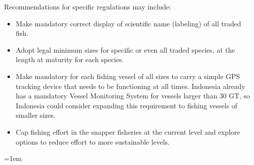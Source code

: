 \noindent Recommendations for specific regulations may include:
\begin{itemize}[noitemsep,topsep=0pt,parsep=0pt,partopsep=0pt]
\item Make mandatory correct display of scientific name (labeling) of all traded fish.
\item Adopt legal minimum sizes for specific or even all traded species, at the length at maturity for each species.
\item Make mandatory for each fishing vessel of all sizes to carry a simple GPS tracking device that needs to be functioning at all times. Indonesia already has a mandatory Vessel Monitoring System for vessels larger than 30 GT, so Indonesia could consider expanding this requirement to fishing vessels of smaller sizes.
\item Cap fishing effort in the snapper fisheries at the current level and explore options to reduce effort to more sustainable levels.
\end{itemize}
\parskip=1em